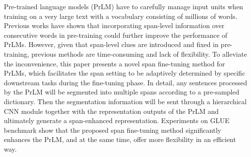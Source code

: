 Pre-trained language models (PrLM) have to carefully manage input units when training on a very large text with a vocabulary consisting of millions of words. Previous works have shown that incorporating span-level information over consecutive words in pre-training could further improve the performance of PrLMs. However, given that span-level clues are introduced and fixed in pre-training, previous methods are time-consuming and lack of flexibility. To alleviate the inconvenience, this paper presents a novel span fine-tuning method for PrLMs, which facilitates the span setting to be adaptively determined by specific downstream tasks during the fine-tuning phase. In detail, any sentences processed by the PrLM will be segmented into multiple spans according to a pre-sampled dictionary. Then the segmentation information will be sent through a hierarchical CNN module together with the representation outputs of the PrLM and ultimately generate a span-enhanced representation. Experiments on GLUE benchmark show that the proposed span fine-tuning method significantly enhances the PrLM, and at the same time, offer more flexibility in an efficient way.
